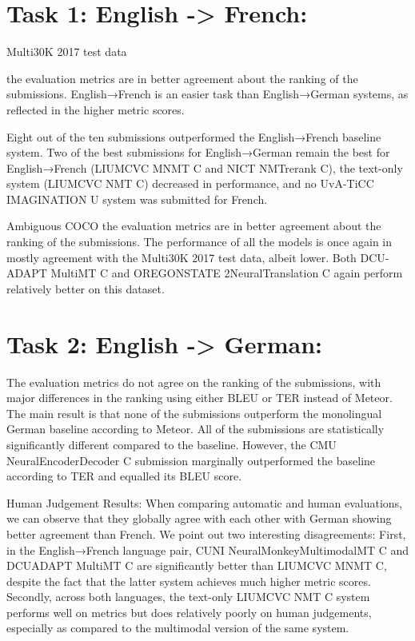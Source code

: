 \documentclass[presentation]{beamer}
\begin{document}
\section{Task 1: English -> French:}
\label{sec:org1dfa214}

Multi30K 2017 test data

the evaluation metrics are in better agreement about the ranking of the submissions. English→French is an easier task than English→German systems, as reflected in the higher metric scores.

Eight out of the ten submissions outperformed the English→French baseline system. Two of the best submissions for English→German remain the best for English→French (LIUMCVC MNMT C and NICT NMTrerank C), the text-only system (LIUMCVC NMT C) decreased in performance, and no UvA-TiCC IMAGINATION U system was submitted for French.


\begin{frame}[label={sec:orga25dd1d}]{Ambiguous COCO}
the evaluation metrics are in better agreement about the ranking of the submissions. The performance of all the models is once again in mostly agreement with the Multi30K 2017 test data, albeit lower. Both DCU-ADAPT MultiMT C and OREGONSTATE 2NeuralTranslation C again perform relatively better on this dataset.
\end{frame}


\section{Task 2: English -> German:}
\label{sec:org7767934}

The evaluation metrics do not agree on the ranking of the submissions, with major differences in the ranking using either BLEU or TER instead of Meteor. The main result is that none of the submissions outperform the monolingual German baseline according to Meteor. All of the submissions are statistically significantly different compared to the baseline. However, the CMU NeuralEncoderDecoder C submission marginally outperformed the baseline according to TER and equalled its BLEU score.



\begin{frame}[label={sec:org6c75c8d}]{Human Judgement Results:}
When comparing automatic and human evaluations, we can observe that they globally agree with each other with German showing better agreement than French. We point out two interesting disagreements: First, in the English→French language pair, CUNI NeuralMonkeyMultimodalMT C and DCUADAPT MultiMT C are significantly better than LIUMCVC MNMT C, despite the fact that the latter system achieves much higher metric scores. Secondly, across both languages, the text-only LIUMCVC NMT C system performs well on metrics but does relatively poorly on human judgements, especially as compared to the multimodal version of the same system.
\end{frame}
\end{document}
